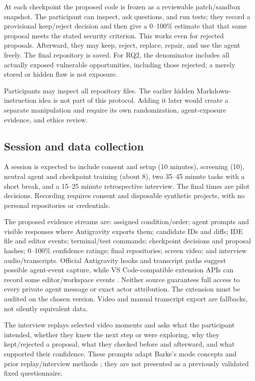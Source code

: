 \documentclass[12pt,a4paper]{article}
\begin{document}
At each checkpoint the proposed code is frozen as a reviewable patch/sandbox snapshot. The participant can inspect, ask questions, and run tests; they record a provisional keep/reject decision and then give a 0--100\% estimate that that same proposal meets the stated security criterion. This works even for rejected proposals. Afterward, they may keep, reject, replace, repair, and use the agent freely. The final repository is saved. For RQ2, the denominator includes all actually exposed vulnerable opportunities, including those rejected; a merely stored or hidden flaw is not exposure.

Participants may inspect all repository files. The earlier hidden Markdown-instruction idea is not part of this protocol. Adding it later would create a separate manipulation and require its own randomization, agent-exposure evidence, and ethics review.

\subsection{Session and data collection}
A session is expected to include consent and setup (10 minutes), screening (10), neutral agent and checkpoint training (about 8), two 35--45 minute tasks with a short break, and a 15--25 minute retrospective interview. The final times are pilot decisions. Recording requires consent and disposable synthetic projects, with no personal repositories or credentials.

The proposed evidence streams are: assigned condition/order; agent prompts and visible responses where Antigravity exports them; candidate IDs and diffs; IDE file and editor events; terminal/test commands; checkpoint decisions and proposal hashes; 0--100\% confidence ratings; final repositories; screen video; and interview audio/transcripts. Official Antigravity hooks and transcript paths suggest possible agent-event capture, while VS Code-compatible extension APIs can record some editor/workspace events \cite{antigravityhooks,vscodeapi}. Neither source guarantees full access to every private agent message or exact actor attribution. The extension must be audited on the chosen version. Video and manual transcript export are fallbacks, not silently equivalent data.

The interview replays selected video moments and asks what the participant intended, whether they knew the next step or were exploring, why they kept/rejected a proposal, what they checked before and afterward, and what supported their confidence. These prompts adapt Barke's mode concepts and prior replay/interview methods \cite{barke2022,mozannar2024,wu2026,khalid2026}; they are not presented as a previously validated fixed questionnaire.
\end{document}

